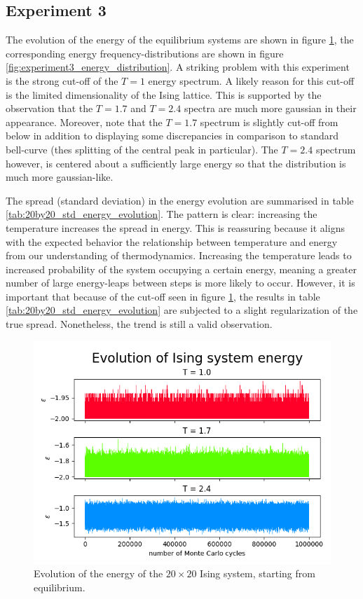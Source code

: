 \documentclass[nofootinbib,reprint,english]{revtex4-1}
\begin{document}
\subsection{Experiment 3}
The evolution of the energy of the equilibrium systems are shown in figure \ref{fig:experiment3_system_energy}, the corresponding energy frequency-distributions are shown in figure \ref{fig:experiment3_energy_distribution}. A striking problem with this experiment is the strong cut-off of the \(T=1\) energy spectrum. A likely reason for this cut-off is the limited dimensionality of the Ising lattice. This is supported by the observation that the \(T=1.7\) and \(T=2.4\) spectra are much more gaussian in their appearance. Moreover, note that the \(T=1.7\) spectrum is slightly cut-off from below in addition to displaying some discrepancies in comparison to standard bell-curve (thes splitting of the central peak in particular). The \(T=2.4\) spectrum however, is centered about a sufficiently large energy so that the distribution is much more gaussian-like. 

The spread (standard deviation) in the energy evolution are summarised in table \ref{tab:20by20_std_energy_evolution}. The pattern is clear: increasing the temperature increases the spread in energy. This is reassuring because it aligns with the expected behavior the relationship between temperature and energy from our understanding of thermodynamics. Increasing the temperature leads to increased probability of the system occupying a certain energy, meaning a greater number of large energy-leaps between steps is more likely to occur. However, it is important that because of the cut-off seen in figure \ref{fig:experiment3_system_energy}, the results in table \ref{tab:20by20_std_energy_evolution} are subjected to a slight regularization of the true spread. Nonetheless, the trend is still a valid observation.

\begin{figure}
\centering
\includegraphics[scale=0.5]{../output/figures/experiment3/system_energy.png}
\caption{Evolution of the energy of the \(20\times20\) Ising system, starting from equilibrium.}\label{fig:experiment3_system_energy}
\end{figure}
\end{document}
